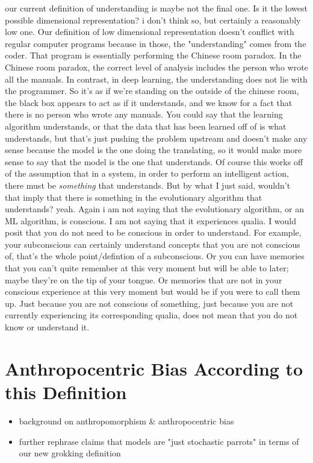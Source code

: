\documentclass{article}
\begin{document}
our current definition of understanding is maybe not the final one. Is it the lowest possible dimensional representation? i don't think so, but certainly a reasonably low one. Our definition of low dimensional representation doesn't conflict with regular computer programs because in those, the "understanding" comes from the coder. That program is essentially performing the Chinese room paradox. In the Chinese room paradox, the correct level of analysis includes the person who wrote all the manuals. In contrast, in deep learning, the understanding does not lie with the programmer. So it's as if we're standing on the outside of the chinese room, the black box appears to act as if it understands, and we know for a fact that there is no person who wrote any manuals. You could say that the learning algorithm understands, or that the data that has been learned off of is what understands, but that's just pushing the problem upstream and doesn't make any sense because the model is the one doing the translating, so it would make more sense to say that the model is the one that understands. Of course this works off of the assumption that in a system, in order to perform an intelligent action, there must be \textit{something} that understands. But by what I just said, wouldn't that imply that there is something in the evolutionary algorithm that understands? yeah. Again i am not saying that the evolutionary algorithm, or an ML algorithm, is conscious. I am not saying that it experiences qualia. I would posit that you do not need to be conscious in order to understand. For example, your subconscious can certainly understand concepts that you are not conscious of, that's the whole point/defintion of a subconscious. Or you can have memories that you can't quite remember at this very moment but will be able to later; maybe they're on the tip of your tongue. Or memories that are not in your conscious experience at this very moment but would be if you were to call them up. Just because you are not conscious of something, just because you are not currently experiencing its corresponding qualia, does not mean that you do not know or understand it. 


\section{Anthropocentric Bias According to this Definition}
\label{sec:anthro}

\begin{itemize}
    \item background on anthropomorphism \& anthropocentric bias
    \item further rephrase claims that models are "just stochastic parrots" in terms of our new grokking definition
\end{itemize}
\end{document}
